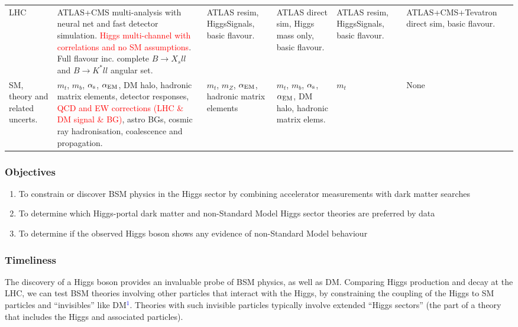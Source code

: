 \documentclass[11pt,oneside,twocolumn,a4paper]{article}
\begin{document}
\begin{table*}
\begin{tabular}{p{15mm}|p{67mm}|p{19mm}|p{19mm}|p{19mm}|p{19mm}}
LHC & ATLAS+CMS multi-analysis with neural net and fast detector simulation.  \textcolor{red}{Higgs multi-channel with correlations and no SM assumptions}. Full flavour inc. complete $B\to X_sll$ and $B\to K^*ll$ angular set. & ATLAS resim, HiggsSignals, basic flavour. & ATLAS direct sim, Higgs mass only, basic flavour. & ATLAS resim, HiggsSignals, basic flavour. & ATLAS+CMS+\newline Tevatron direct sim, basic flavour. \\

SM, theory and related uncerts. & $m_t$, $m_b$, $\alpha_{\rm s}$, $\alpha_{\rm EM}$, DM halo, hadronic matrix elements, detector responses, \textcolor{red}{QCD and EW corrections (LHC \& DM signal \& BG)}, astro BGs, cosmic ray hadronisation, coalescence and propagation. & $m_t$, $m_Z$, $\alpha_{\rm EM}$, hadronic matrix elements & $m_t$, $m_b$, $\alpha_{\rm s}$, $\alpha_{\rm EM}$, DM halo, hadronic matrix elems. & $m_t$ & None \\

\hline
\end{tabular}

\end{table*}



\subsubsection*{Objectives}

\begin{enumerate}
\setlength{\itemsep}{2pt}
\item To constrain or discover BSM physics in the Higgs sector by combining accelerator measurements with dark matter searches
\item To determine which Higgs-portal dark matter and non-Standard Model Higgs sector theories are preferred by data
\item To determine if the observed Higgs boson shows any evidence of non-Standard Model behaviour
\end{enumerate}\smallskip


\subsubsection*{Timeliness}

\noindent The discovery of a Higgs boson provides an invaluable probe of BSM physics, as well as DM.  Comparing Higgs production and decay at the LHC, we can test BSM theories involving other particles that interact with the Higgs, by constraining the coupling of the Higgs to SM particles and ``invisibles'' like DM\textcolor{blue}{$^1$}.  Theories with such invisible particles typically involve extended ``Higgs sectors'' (the part of a theory that includes the Higgs and associated particles).
\end{document}
